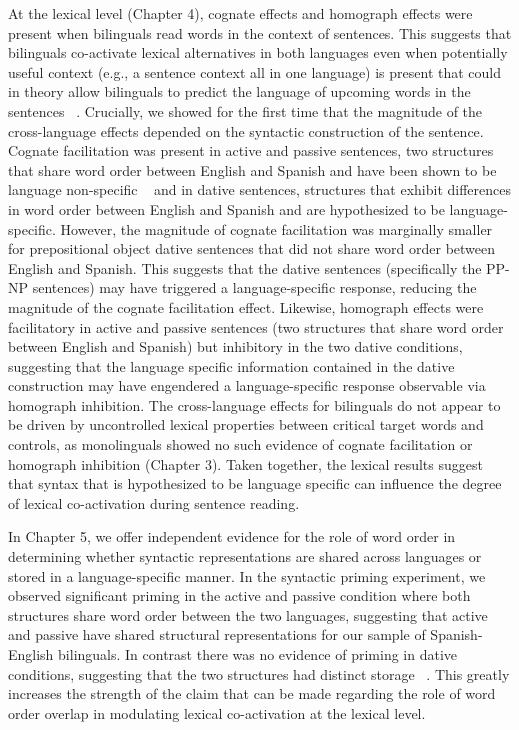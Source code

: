 At the lexical level (Chapter 4), cognate effects and homograph effects were present when bilinguals read words in the context of sentences. This suggests that bilinguals co-activate lexical alternatives in both languages even when potentially useful context (e.g., a sentence context all in one language) is present that could in theory allow bilinguals to predict the language of upcoming words in the sentences ~\citep[e.g.,][]{Duyck2007}. Crucially, we showed for the first time that the magnitude of the cross-language effects depended on the syntactic construction of the sentence. Cognate facilitation was present in active and passive sentences, two structures that share word order between English and Spanish and have been shown to be language non-specific ~\citep{Hartsuiker2004} and in dative sentences, structures that exhibit differences in word order between English and Spanish and are hypothesized to be language-specific. However, the magnitude of cognate facilitation was marginally smaller for prepositional object dative sentences that did not share word order between English and Spanish. This suggests that the dative sentences (specifically the PP-NP sentences) may have triggered a language-specific response, reducing the magnitude of the cognate facilitation effect. Likewise, homograph effects were facilitatory in active and passive sentences (two structures that share word order between English and Spanish) but inhibitory in the two dative conditions, suggesting that the language specific information contained in the dative construction may have engendered a language-specific response observable via homograph inhibition. The cross-language effects for bilinguals do not appear to be driven by uncontrolled lexical properties between critical target words and controls, as monolinguals showed no such evidence of cognate facilitation or homograph inhibition (Chapter 3). Taken together, the lexical results suggest that syntax that is hypothesized to be language specific can influence the degree of lexical co-activation during sentence reading. 

In Chapter 5, we offer independent evidence for the role of word order in determining whether syntactic representations are shared across languages or stored in a language-specific manner. In the syntactic priming experiment, we observed significant priming in the active and passive condition where both structures share word order between the two languages, suggesting that active and passive have shared structural representations for our sample of Spanish-English bilinguals. In contrast there was no evidence of priming in dative conditions, suggesting that the two structures had distinct storage ~\citep[e.g.,][]{Bernolet2007,Loebell2003}. This greatly increases the strength of the claim that can be made regarding the role of word order overlap in modulating lexical co-activation at the lexical level.

